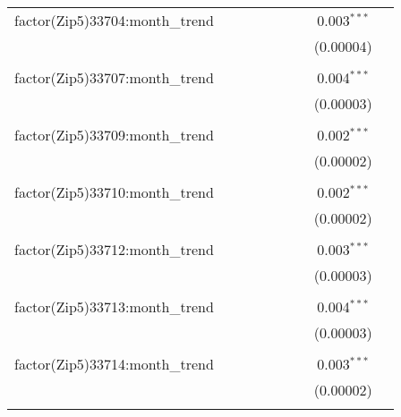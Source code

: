 \begin{table}[H]
{\begin{tabular}{@{\extracolsep{5pt}}lcccccccc}
  factor(Zip5)33704:month\_trend &  &  &  &  &  &  & 0.003$^{***}$ &  \\  

   &  &  &  &  &  &  & (0.00004) &  \\  

   & & & & & & & & \\  

  factor(Zip5)33707:month\_trend &  &  &  &  &  &  & 0.004$^{***}$ &  \\  

   &  &  &  &  &  &  & (0.00003) &  \\  

   & & & & & & & & \\  

  factor(Zip5)33709:month\_trend &  &  &  &  &  &  & 0.002$^{***}$ &  \\  

   &  &  &  &  &  &  & (0.00002) &  \\  

   & & & & & & & & \\  

  factor(Zip5)33710:month\_trend &  &  &  &  &  &  & 0.002$^{***}$ &  \\  

   &  &  &  &  &  &  & (0.00002) &  \\  

   & & & & & & & & \\  

  factor(Zip5)33712:month\_trend &  &  &  &  &  &  & 0.003$^{***}$ &  \\  

   &  &  &  &  &  &  & (0.00003) &  \\  

   & & & & & & & & \\  

  factor(Zip5)33713:month\_trend &  &  &  &  &  &  & 0.004$^{***}$ &  \\  

   &  &  &  &  &  &  & (0.00003) &  \\  

   & & & & & & & & \\  

  factor(Zip5)33714:month\_trend &  &  &  &  &  &  & 0.003$^{***}$ &  \\  

   &  &  &  &  &  &  & (0.00002) &  \\  

   & & & & & & & & \\  


\end{tabular}}
\end{table}
